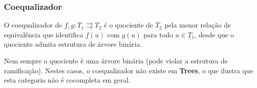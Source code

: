 \subsubsection{Coequalizador}

O coequalizador de $f, g: T_1 \rightrightarrows T_2$ é o quociente de $T_2$ pela menor relação de equivalência que identifica $f(u)$ com $g(u)$ para todo $u \in T_1$, desde que o quociente admita estrutura de árvore binária.

\begin{remark}
Nem sempre o quociente é uma árvore binária (pode violar a estrutura de ramificação). Nestes casos, o coequalizador não existe em \textbf{Trees}, o que ilustra que esta categoria não é cocompleta em geral.
\end{remark}